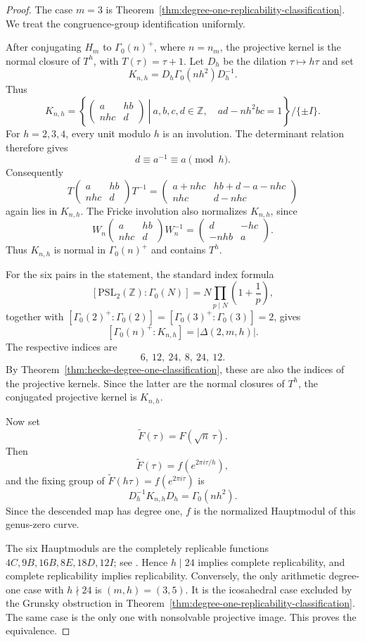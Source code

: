 \documentclass[11pt]{amsart}
\theoremstyle{definition}
\theoremstyle{remark}
\numberwithin{equation}{section}
\begin{document}
\begin{proof}
The case $m=3$ is Theorem~\ref{thm:degree-one-replicability-classification}. We treat the congruence-group identification uniformly.

After conjugating $H_m$ to $\Gamma_0(n)^+$, where $n=n_m$, the projective kernel is the normal closure of $T^h$, with $T(\tau)=\tau+1$. Let $D_h$ be the dilation $\tau\mapsto h\tau$ and set
\[
K_{n,h}=D_h\Gamma_0(nh^2)D_h^{-1}.
\]
Thus
\[
K_{n,h}
=
\left\{
\left.
\begin{pmatrix}
 a&hb\\
 nhc&d
\end{pmatrix}
\ \right|\
 a,b,c,d\in\mathbb Z,\quad ad-nh^2bc=1
\right\}/\{\pm I\}.
\]
For $h=2,3,4$, every unit modulo $h$ is an involution. The determinant relation therefore gives
\[
d\equiv a^{-1}\equiv a\pmod h.
\]
Consequently
\[
T
\begin{pmatrix}
 a&hb\\ nhc&d
\end{pmatrix}
T^{-1}
=
\begin{pmatrix}
 a+nhc&hb+d-a-nhc\\
 nhc&d-nhc
\end{pmatrix}
\]
again lies in $K_{n,h}$. The Fricke involution also normalizes $K_{n,h}$, since
\[
W_n
\begin{pmatrix}
 a&hb\\ nhc&d
\end{pmatrix}
W_n^{-1}
=
\begin{pmatrix}
 d&-hc\\ -nhb&a
\end{pmatrix}.
\]
Thus $K_{n,h}$ is normal in $\Gamma_0(n)^+$ and contains $T^h$.

For the six pairs in the statement, the standard index formula
\[
[\mathrm{PSL}_2(\mathbb Z):\Gamma_0(N)]
=N\prod_{p\mid N}\left(1+\frac1p\right),
\]
together with $[\Gamma_0(2)^+:\Gamma_0(2)]=[\Gamma_0(3)^+:\Gamma_0(3)]=2$, gives
\[
[\Gamma_0(n)^+:K_{n,h}]
=|\Delta(2,m,h)|.
\]
The respective indices are
\[
6,\ 12,\ 24,\ 8,\ 24,\ 12.
\]
By Theorem~\ref{thm:hecke-degree-one-classification}, these are also the indices of the projective kernels. Since the latter are the normal closures of $T^h$, the conjugated projective kernel is $K_{n,h}$.

Now set
\[
\widetilde F(\tau)=F(\sqrt n\,\tau).
\]
Then
\[
\widetilde F(\tau)=f(e^{2\pi i\tau/h}),
\]
and the fixing group of $\widetilde F(h\tau)=f(e^{2\pi i\tau})$ is
\[
D_h^{-1}K_{n,h}D_h=\Gamma_0(nh^2).
\]
Since the descended map has degree one, $f$ is the normalized Hauptmodul of this genus-zero curve.

The six Hauptmoduls are the completely replicable functions $4C,9B,16B,8E,18D,12I$; see \cite{alexander-replicable,ford-mckay-norton,elbasraoui-mckay}. Hence $h\mid24$ implies complete replicability, and complete replicability implies replicability. Conversely, the only arithmetic degree-one case with $h\nmid24$ is $(m,h)=(3,5)$. It is the icosahedral case excluded by the Grunsky obstruction in Theorem~\ref{thm:degree-one-replicability-classification}. The same case is the only one with nonsolvable projective image. This proves the equivalence.
\end{proof}
\end{document}
